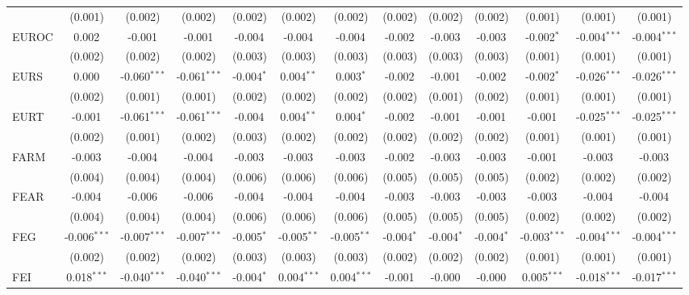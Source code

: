 \begin{table}[!htbp]
\begin{tabular}{@{\extracolsep{5pt}}lcccccccccccc}
  & (0.001) & (0.002) & (0.002) & (0.002) & (0.002) & (0.002) & (0.002) & (0.002) & (0.002) & (0.001) & (0.001) & (0.001) \\
 EUROC & 0.002$^{}$ & -0.001$^{}$ & -0.001$^{}$ & -0.004$^{}$ & -0.004$^{}$ & -0.004$^{}$ & -0.002$^{}$ & -0.003$^{}$ & -0.003$^{}$ & -0.002$^{*}$ & -0.004$^{***}$ & -0.004$^{***}$ \\
  & (0.002) & (0.002) & (0.002) & (0.003) & (0.003) & (0.003) & (0.003) & (0.003) & (0.003) & (0.001) & (0.001) & (0.001) \\
 EURS & 0.000$^{}$ & -0.060$^{***}$ & -0.061$^{***}$ & -0.004$^{*}$ & 0.004$^{**}$ & 0.003$^{*}$ & -0.002$^{}$ & -0.001$^{}$ & -0.002$^{}$ & -0.002$^{*}$ & -0.026$^{***}$ & -0.026$^{***}$ \\
  & (0.002) & (0.001) & (0.001) & (0.002) & (0.002) & (0.002) & (0.002) & (0.001) & (0.002) & (0.001) & (0.001) & (0.001) \\
 EURT & -0.001$^{}$ & -0.061$^{***}$ & -0.061$^{***}$ & -0.004$^{}$ & 0.004$^{**}$ & 0.004$^{*}$ & -0.002$^{}$ & -0.001$^{}$ & -0.001$^{}$ & -0.001$^{}$ & -0.025$^{***}$ & -0.025$^{***}$ \\
  & (0.002) & (0.001) & (0.002) & (0.003) & (0.002) & (0.002) & (0.002) & (0.002) & (0.002) & (0.001) & (0.001) & (0.001) \\
 FARM & -0.003$^{}$ & -0.004$^{}$ & -0.004$^{}$ & -0.003$^{}$ & -0.003$^{}$ & -0.003$^{}$ & -0.002$^{}$ & -0.003$^{}$ & -0.003$^{}$ & -0.001$^{}$ & -0.003$^{}$ & -0.003$^{}$ \\
  & (0.004) & (0.004) & (0.004) & (0.006) & (0.006) & (0.006) & (0.005) & (0.005) & (0.005) & (0.002) & (0.002) & (0.002) \\
 FEAR & -0.004$^{}$ & -0.006$^{}$ & -0.006$^{}$ & -0.004$^{}$ & -0.004$^{}$ & -0.004$^{}$ & -0.003$^{}$ & -0.003$^{}$ & -0.003$^{}$ & -0.003$^{}$ & -0.004$^{}$ & -0.004$^{}$ \\
  & (0.004) & (0.004) & (0.004) & (0.006) & (0.006) & (0.006) & (0.005) & (0.005) & (0.005) & (0.002) & (0.002) & (0.002) \\
 FEG & -0.006$^{***}$ & -0.007$^{***}$ & -0.007$^{***}$ & -0.005$^{*}$ & -0.005$^{**}$ & -0.005$^{**}$ & -0.004$^{*}$ & -0.004$^{*}$ & -0.004$^{*}$ & -0.003$^{***}$ & -0.004$^{***}$ & -0.004$^{***}$ \\
  & (0.002) & (0.002) & (0.002) & (0.003) & (0.003) & (0.003) & (0.002) & (0.002) & (0.002) & (0.001) & (0.001) & (0.001) \\
 FEI & 0.018$^{***}$ & -0.040$^{***}$ & -0.040$^{***}$ & -0.004$^{*}$ & 0.004$^{***}$ & 0.004$^{***}$ & -0.001$^{}$ & -0.000$^{}$ & -0.000$^{}$ & 0.005$^{***}$ & -0.018$^{***}$ & -0.017$^{***}$ \\

\end{tabular}
\end{table}
